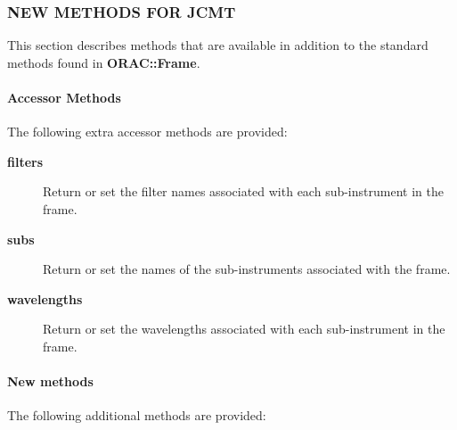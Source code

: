 \subsubsection*{NEW METHODS FOR JCMT\label{ORAC::Frame::JCMT_NEW_METHODS_FOR_JCMT}}

This section describes methods that are available in addition
to the standard methods found in \textbf{ORAC::Frame}.

\paragraph*{Accessor Methods\label{ORAC::Frame::JCMT_Accessor_Methods}}

The following extra accessor methods are provided:

\begin{description}
\item[\textbf{filters}] \mbox{}

Return or set the filter names associated with each sub-instrument
in the frame.

\item[\textbf{subs}] \mbox{}

Return or set the names of the sub-instruments associated
with the frame.

\item[\textbf{wavelengths}] \mbox{}

Return or set the wavelengths associated with each  sub-instrument
in the frame.

\end{description}
\paragraph*{New methods\label{ORAC::Frame::JCMT_New_methods}}

The following additional methods are provided:

